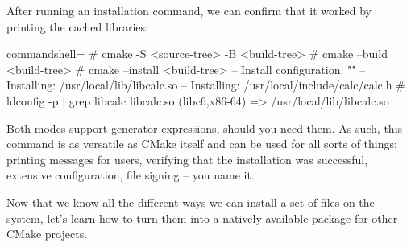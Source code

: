 After running an installation command, we can confirm that it worked by printing the cached libraries:

\begin{tcblisting}{commandshell={}}
# cmake -S <source-tree> -B <build-tree>
# cmake --build <build-tree>
# cmake --install <build-tree>
-- Install configuration: ""
-- Installing: /usr/local/lib/libcalc.so
-- Installing: /usr/local/include/calc/calc.h
# ldconfig -p | grep libcalc
          libcalc.so (libc6,x86-64) => /usr/local/lib/libcalc.so
\end{tcblisting}

Both modes support generator expressions, should you need them. As such, this command is as versatile as CMake itself and can be used for all sorts of things: printing messages for users, verifying that the installation was successful, extensive configuration, file signing – you name it.

Now that we know all the different ways we can install a set of files on the system, let's learn how to turn them into a natively available package for other CMake projects.





